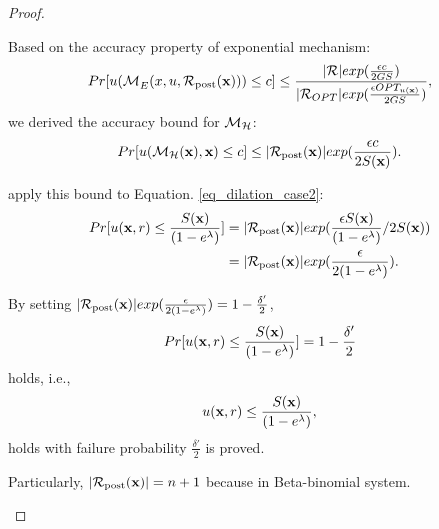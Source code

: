\documentclass{article}
\begin{document}
\begin{proof}
\begin{itemize}
          Based on the accuracy property of exponential mechanism:
          \begin{equation*}
          \begin{split}
          Pr[u(\mathcal{M}_E^{}({x},{u},{\mathcal{R}_{\textup{post}}(\textbf{x})})) \leq c] 
          & \leq \frac{|\mathcal{R}|exp(\frac{\epsilon c}{2 GS})}{|\mathcal{R}_{OPT}| exp(\frac{\epsilon OPT_{u(\textbf{x})}}{2 GS})},\\
          \end{split}
          \end{equation*}
          we derived the accuracy bound for $\mathcal{M}_{\mathcal{H}}$:
          \begin{equation*}
          Pr[u(\mathcal{M}_{\mathcal{H}}(\textbf{x}), \textbf{x}) \leq c] \leq |\mathcal{R}_{\textup{post}}(\textbf{x})|exp(\frac{\epsilon c}{2 S(\textbf{x})}).
          \end{equation*}

          apply this bound to Equation. \ref{eq_dilation_case2}:
          \begin{equation*}
          \begin{split}
          Pr[u(\textbf{x}, {r}) \leq \frac{S(\textbf{x})}{(1 - e ^ {\lambda})}] 
          & = |\mathcal{R}_{\textup{post}}(\textbf{x})|exp(\frac{\epsilon S(\textbf{x})}{(1 - e ^ {\lambda})}/2 S(\textbf{x}))\\
          & = |\mathcal{R}_{\textup{post}}(\textbf{x})|exp(\frac{\epsilon}{2 (1 - e ^ {\lambda})}).\\
          \end{split}
          \end{equation*}

          By setting $|\mathcal{R}_{\textup{post}}(\textbf{x})|exp(\frac{\epsilon}{2 (1 - e ^ {\lambda})}) = 1 - \frac{\delta'}{2}$, 
          \begin{equation*}
          \begin{split}
          Pr[u(\textbf{x}, {r}) \leq \frac{S(\textbf{x})}{(1 - e ^ {\lambda})}] = 1 - \frac{\delta'}{2}
          \end{split}
          \end{equation*}
          holds, i.e.,
          \begin{equation*}
          u(\textbf{x}, {r})
          \leq 
          \frac{S(\textbf{x})}{(1 - e ^ {\lambda})},
          \end{equation*}         
          holds with failure probability $\frac{\delta'}{2}$ is proved.

          Particularly, $|\mathcal{R}_{\textup{post}}(\textbf{x})| = n + 1$ because in Beta-binomial system.

      \end{itemize}


\end{proof}
\end{document}
